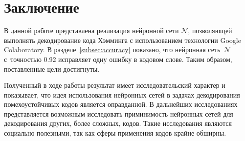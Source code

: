 \section{Заключение}\label{subsec:conclusions}

В данной работе представлена реализация нейронной сети $\mathcal{N}$, позволяющей выполнять декодирование кода Хэмминга с использованием технологии Google Colaboratory. В разделе~\ref{subsec:accuracy} показано, что нейронная сеть~$\mathcal{N}$ с~точностью 0.92 исправляет одну ошибку в кодовом слове. Таким образом, поставленные цели достигнуты.

Полученный в ходе работы результат имеет исследовательский характер и показывает, что идея использования нейронных сетей в задачах декодирования помехоустойчивых кодов является оправданной. В дальнейших исследованиях представляется возможным исследовать приминимость нейронных сетей для декодирования других, более сложных, кодов. Такие исследования являются социально полезными, так как сферы применения кодов крайне обширны.

\newpage
